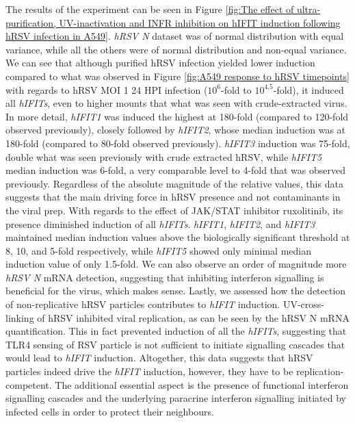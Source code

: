 The results of the experiment can be seen in Figure \ref{fig:The effect of ultra-purification, UV-inactivation and INFR inhibition on hIFIT induction following hRSV infection in A549}. \textit{hRSV N} dataset was of normal distribution with equal variance, while all the others were of normal distribution and non-equal variance. We can see that although purified hRSV infection yielded lower induction compared to what was observed in Figure \ref{fig:A549 response to hRSV timepoints} with regards to hRSV MOI 1 24 HPI infection (\(10^6\)-fold to \(10^{4.5}\)-fold), it induced all \textit{hIFITs}, even to higher mounts that what was seen with crude-extracted virus. In more detail, \textit{hIFIT1} was induced the highest at 180-fold (compared to 120-fold observed previously), closely followed by \textit{hIFIT2}, whose median induction was at 180-fold (compared to 80-fold observed previously). \textit{hIFIT3} induction was 75-fold, double what was seen previously with crude extracted hRSV, while \textit{hIFIT5} median induction was 6-fold, a very comparable level to 4-fold that was observed previously. Regardless of the absolute magnitude of the relative values, this data suggests that the main driving force in hRSV presence and not contaminants in the viral prep. With regards to the effect of JAK/STAT inhibitor ruxolitinib, its presence diminished induction of all \textit{hIFITs}. \textit{hIFIT1}, \textit{hIFIT2}, and \textit{hIFIT3} maintained median induction values above the biologically significant threshold at 8, 10, and 5-fold respectively, while \textit{hIFIT5} showed only minimal median induction value of only 1.5-fold. We can also observe an order of magnitude more \textit{hRSV N} mRNA detection, suggesting that inhibiting interferon signalling is beneficial for the virus, which makes sense. Lastly, we assessed how the detection of non-replicative hRSV particles contributes to \textit{hIFIT} induction. UV-cross-linking of hRSV inhibited viral replication, as can be seen by the {hRSV N} mRNA quantification. This in fact prevented induction of all the \textit{hIFITs}, suggesting that TLR4 sensing of RSV particle is not sufficient to initiate signalling cascades that would lead to \textit{hIFIT} induction. Altogether, this data suggests that hRSV particles indeed drive the \textit{hIFIT} induction, however, they have to be replication-competent. The additional essential aspect is the presence of functional interferon signalling cascades and the underlying paracrine interferon signalling initiated by infected cells in order to protect their neighbours.

